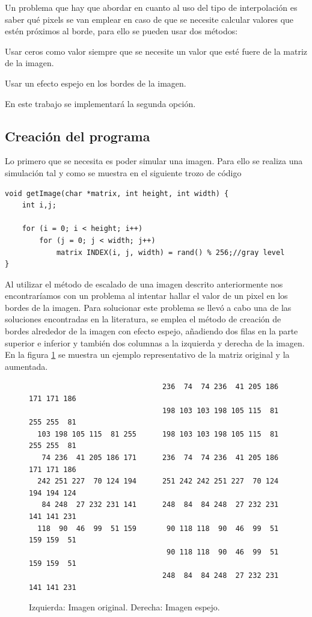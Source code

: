 \documentclass{article}
\begin{document}
Un problema que hay que abordar en cuanto al uso del tipo de interpolación es saber qué pixels se van emplear en caso de que se necesite calcular valores que estén próximos al borde, para ello se pueden usar dos métodos:{\setlength{\parskip}{0mm}
\begin{enumerate}{\setlength{\parskip}{0mm}
	\item Usar ceros como valor siempre que se necesite un valor que esté fuere de la matriz de la imagen.
	\item Usar un efecto espejo en los bordes de la imagen.
}\end{enumerate}
}En este trabajo se implementará la segunda opción.

\subsection{Creación del programa}
Lo primero que se necesita es poder simular una imagen. Para ello se realiza una simulación tal y como se muestra en el siguiente trozo de código

\begin{lstlisting}[style=C]
void getImage(char *matrix, int height, int width) {
	int i,j;
	 
	for (i = 0; i < height; i++)
		for (j = 0; j < width; j++)
			matrix INDEX(i, j, width) = rand() % 256;//gray level
}
\end{lstlisting}

Al utilizar el método de escalado de una imagen descrito anteriormente nos encontraríamos con un problema al intentar hallar el valor de un pixel en los bordes de la imagen. Para solucionar este problema se llevó a cabo una de las soluciones encontradas en la literatura, se emplea el método de creación de bordes alrededor de la imagen con efecto espejo, añadiendo dos filas en la parte superior e inferior y también dos columnas a la izquierda y derecha de la imagen. 
En la figura \ref{fig:ejemploMatrices} se muestra un ejemplo representativo de la matriz original y la aumentada.

\begin{figure}[h]
\centering
\begin{lstlisting}
                               236  74  74 236  41 205 186 171 171 186
                               198 103 103 198 105 115  81 255 255  81 
  103 198 105 115  81 255      198 103 103 198 105 115  81 255 255  81   
   74 236  41 205 186 171      236  74  74 236  41 205 186 171 171 186
  242 251 227  70 124 194      251 242 242 251 227  70 124 194 194 124
   84 248  27 232 231 141      248  84  84 248  27 232 231 141 141 231
  118  90  46  99  51 159       90 118 118  90  46  99  51 159 159  51 
                                90 118 118  90  46  99  51 159 159  51
                               248  84  84 248  27 232 231 141 141 231	
\end{lstlisting}
\caption{Izquierda: Imagen original. Derecha: Imagen espejo.}
\label{fig:ejemploMatrices}
\end{figure}
\end{document}
